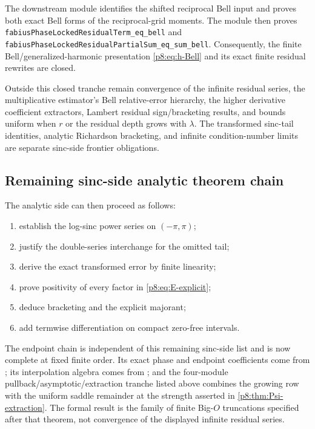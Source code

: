 \documentclass[11pt]{article}
\numberwithin{equation}{section}
\theoremstyle{definition}
\theoremstyle{remark}
\begin{document}
The downstream module  identifies the
shifted reciprocal Bell input and proves both exact Bell forms of the
reciprocal-grid moments.  The module
 then proves
\nolinkurl{fabiusPhaseLockedResidualTerm_eq_bell} and
\nolinkurl{fabiusPhaseLockedResidualPartialSum_eq_sum_bell}.  Consequently,
the finite Bell/generalized-harmonic presentation \eqref{p8:eq:h-Bell} and its
exact finite residual rewrites are closed.

Outside this closed tranche remain convergence of the infinite residual
series, the multiplicative estimator's Bell relative-error hierarchy, the
higher derivative coefficient extractors, Lambert residual sign/bracketing
results, and bounds uniform when $r$ or the residual depth grows with
$\lambda$.  The transformed sinc-tail identities, analytic Richardson
bracketing, and infinite condition-number limits are separate sinc-side
frontier obligations.

\subsection{Remaining sinc-side analytic theorem chain}

The analytic side can then proceed as follows:
\begin{enumerate}
\item establish the log-sinc power series on $(-\pi,\pi)$;
\item justify the double-series interchange for the omitted tail;
\item derive the exact transformed error by finite linearity;
\item prove positivity of every factor in \cref{p8:eq:E-explicit};
\item deduce bracketing and the explicit majorant;
\item add termwise differentiation on compact zero-free intervals.
\end{enumerate}

The endpoint chain is independent of this remaining sinc-side list and is now
complete at fixed finite order.  Its exact phase and endpoint coefficients
come from ; its interpolation algebra
comes from ; and the four-module
pullback/asymptotic/extraction tranche listed above combines the growing row
with the uniform saddle remainder at the strength asserted in
\cref{p8:thm:Psi-extraction}.  The formal result is the family of finite
Big-$O$ truncations specified after that theorem, not convergence of the
displayed infinite residual series.
\end{document}
